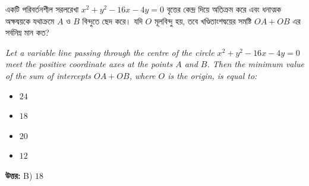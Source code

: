 \documentclass[12pt, a4paper]{article}
\begin{document}
\vspace{2em}

\begin{tcolorbox}[questionbox={প্রশ্ন (Question) 8}]
    \noindent
    একটি পরিবর্তনশীল সরলরেখা $x^2 + y^2 - 16x - 4y = 0$ বৃত্তের কেন্দ্র দিয়ে অতিক্রম করে এবং ধনাত্মক অক্ষদ্বয়কে যথাক্রমে $A$ ও $B$ বিন্দুতে ছেদ করে। যদি $O$ মূলবিন্দু হয়, তবে খণ্ডিতাংশদ্বয়ের সমষ্টি $OA + OB$ এর সর্বনিম্ন মান কত?
    
    \vspace{0.8em}
    \begin{english}
    \noindent\textit{\color{darkgray}
    Let a variable line passing through the centre of the circle $x^2 + y^2 - 16x - 4y = 0$ meet the positive coordinate axes at the points $A$ and $B$. Then the minimum value of the sum of intercepts $OA + OB$, where $O$ is the origin, is equal to:
    }
    \end{english}
\end{tcolorbox}

\begin{itemize}[label={}, leftmargin=1cm, itemsep=0.5em]
    \item[\textbf{A)}] $24$
    \item[\textbf{B)}] $18$
    \item[\textbf{C)}] $20$
    \item[\textbf{D)}] $12$
\end{itemize}

\vspace{0.5em}
\begin{tcolorbox}[answerbox]
    \textbf{\color{success} উত্তর:} B) $18$
\end{tcolorbox}
\vspace{1em}
\end{document}
